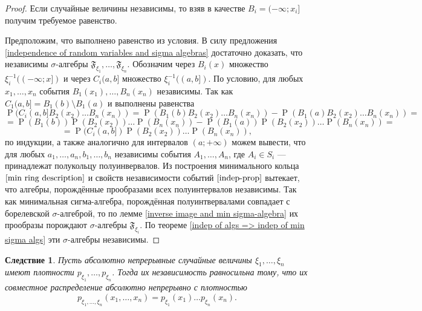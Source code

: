 \documentclass[12pt]{article}
\newtheorem{corollary}[theorem]{Следствие}
\numberwithin{theorem}{section}
\theoremstyle{definition}
\newcommand{\prob}{\operatorname{P}}
\newcommand{\events}{\mathfrak{F}}
\begin{document}
	\begin{proof}
		Если случайные величины независимы, то взяв в качестве $ B_i = (-\infty; x_i] $
		получим требуемое равенство.
		
		Предположим, что выполнено равенство из условия.
		В силу предложения \ref{independence of random variables and sigma algebras}
		достаточно доказать, что независимы $ \sigma $-алгебры
		$ \events_{\xi_1}, \ldots, \events_{\xi_n} $.
		Обозначим через $ B_i(x) $ множество $ \xi_i^{-1}((-\infty; x]) $
		и через $ C_i(a,b] $ множество $ \xi_i^{-1}((a,b]) $.
		По условию, для любых $ x_1, \ldots, x_n $ события
		$ B_1(x_1), \ldots, B_n(x_n) $ независимы.
		Так как $ C_1(a,b] = B_1(b) \setminus B_1(a) $
		и выполнены равенства
		$$ \prob(C_i(a,b]B_2(x_2)\ldots B_n(x_n))
		= \prob(B_1(b)B_2(x_2)\ldots B_n(x_n))
		- \prob(B_1(a)B_2(x_2)\ldots B_n(x_n)) = $$  
		$$ = \prob(B_1(b))\prob(B_2(x_2))\ldots \prob(B_n(x_n))
		- \prob(B_1(a))\prob(B_2(x_2))\ldots \prob(B_n(x_n)) = $$  
		$$ = \prob(C_i(a,b])\prob(B_2(x_2))\ldots \prob(B_n(x_n)), $$
		по индукции, а также аналогично для интервалов $ (a;+\infty) $ 
		можем вывести, что для любых $ a_1,\ldots, a_n, b_1, \ldots, b_n $
		независимы события $ A_1, \ldots, A_n $, где $ A_i \in S_i $ --- принадлежат полукольцу
		полуинвервалов. Из построения минимального кольца $ \ref{min ring description} $
		и свойств независимости событий $ \ref{indep-prop} $ вытекает, что
		алгебры, порождённые прообразами всех полуинтервалов независимы.
		Так как минимальная сигма-алгебра, порождённая полуинтвервалами совпадает с борелевской $ \sigma $-алгеброй,
		то по лемме \ref{inverse image and min sigma-algebra} их прообразы порождают $ \sigma $-алгебры $ \events_{\xi_i} $.
		По теореме \ref{indep of algs => indep of min sigma algs} эти $ \sigma $-алгебры независимы.
	\end{proof}
	
	\begin{corollary}
		Пусть абсолютно непрерывные случайные величины $ \xi_1, \ldots, \xi_n $ 
		имеют плотности $ p_{\xi_1}, \ldots, p_{\xi_n} $.
		Тогда их независимость равносильна тому, что 
		их совместное распределение абсолютно непрерывно с плотностью
		$$ p_{\xi_1, \ldots, \xi_n}(x_1, \ldots, x_n) = p_{\xi_1}(x_1)\ldots p_{\xi_n}(x_n). $$
	\end{corollary}
	
\end{document}
